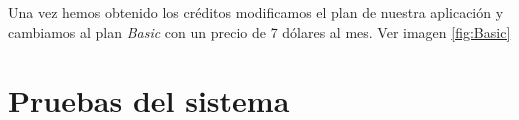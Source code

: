 
Una vez hemos obtenido los créditos modificamos el plan de nuestra aplicación y cambiamos al plan \emph{Basic} con un precio de 7 dólares al mes. Ver imagen \ref{fig:Basic}


\section{Pruebas del sistema}

